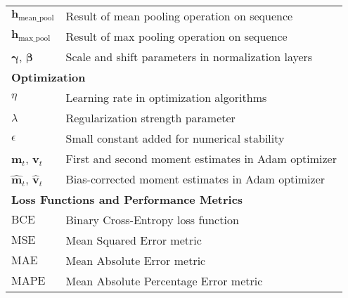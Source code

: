 \begin{appendices}
\begin{table}[htbp]
{\begin{tabular}{p{}p{}}
        $\bm{h}_{\text{mean\_pool}}$                   & Result of mean pooling operation on sequence                                         \\
        $\bm{h}_{\text{max\_pool}}$                    & Result of max pooling operation on sequence                                          \\
        $\bm{\gamma}$, $\bm{\beta}$                    & Scale and shift parameters in normalization layers                                   \\
        \midrule
        \multicolumn{2}{l}{\textbf{Optimization}}                                                                                             \\
        \midrule
        $\eta$                                         & Learning rate in optimization algorithms                                             \\
        $\lambda$                                      & Regularization strength parameter                                                    \\
        $\epsilon$                                     & Small constant added for numerical stability                                         \\
        $\bm{m}_t$, $\bm{v}_t$                         & First and second moment estimates in Adam optimizer                                  \\
        $\hat{\bm{m}}_t$, $\hat{\bm{v}}_t$             & Bias-corrected moment estimates in Adam optimizer                                    \\
        \midrule
        \multicolumn{2}{l}{\textbf{Loss Functions and Performance Metrics}}                                                                   \\
        \midrule
        $\text{BCE}$                                   & Binary Cross-Entropy loss function                                                   \\
        $\text{MSE}$                                   & Mean Squared Error metric                                                            \\
        $\text{MAE}$                                   & Mean Absolute Error metric                                                           \\
        $\text{MAPE}$                                  & Mean Absolute Percentage Error metric                                                \\

\end{tabular}}
\end{table}
\end{appendices}
